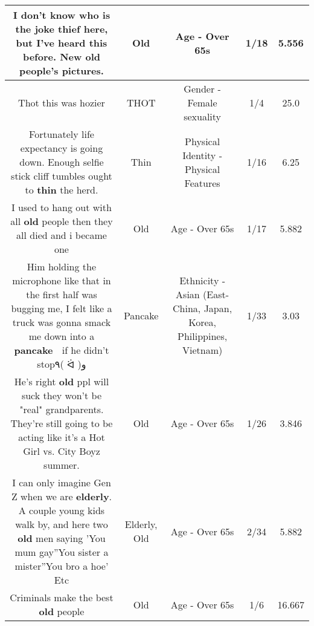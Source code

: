 \documentclass[11pt]{article}
\newlength\mylength
\begin{document}
\begin{center}
\begin{longtable}{|C{.65\mylength}|C{.30\mylength}|C{.12\mylength}|C{.12\mylength}|C{.12\mylength}|}
  \small I don't know who is the joke thief here, but I've heard this before. New \textbf{old} people's pictures.\normalsize   & Old & Age - Over 65s & 1/18 & 5.556 \\  \hline
  \small Thot this was hozier\normalsize   & THOT & Gender - Female sexuality & 1/4 & 25.0 \\  \hline
  \small Fortunately life expectancy is going down. Enough selfie stick cliff tumbles ought to \textbf{thin} the herd.\normalsize   & Thin & Physical Identity - Physical Features & 1/16 & 6.25 \\  \hline
  \small I used to hang out with all \textbf{old} people then they all died and i became one\normalsize   & Old & Age - Over 65s & 1/17 & 5.882 \\  \hline
  \small Him holding the microphone like that in the first half was bugging me, I felt like a truck was gonna smack me down into a \textbf{pancake} 🥞 if he didn't stop٩( ᐛ )و\normalsize   & Pancake & Ethnicity - Asian (East- China, Japan, Korea, Philippines, Vietnam) & 1/33 & 3.03 \\  \hline
  \small He's right \textbf{old} ppl will suck they won't be "real" grandparents. They're still going to be acting like it's a Hot Girl vs. City Boyz summer.\normalsize   & Old & Age - Over 65s & 1/26 & 3.846 \\  \hline
  \small I can only imagine Gen Z when we are \textbf{elderly}. A couple young kids walk by, and here two \textbf{old} men saying 'You mum gay''You sister a mister''You bro a hoe' Etc\normalsize   & Elderly, Old & Age - Over 65s & 2/34 & 5.882 \\  \hline
  \small Criminals make the best \textbf{old} people\normalsize   & Old & Age - Over 65s & 1/6 & 16.667 \\  \hline

\end{longtable}
\end{center}
\end{document}

